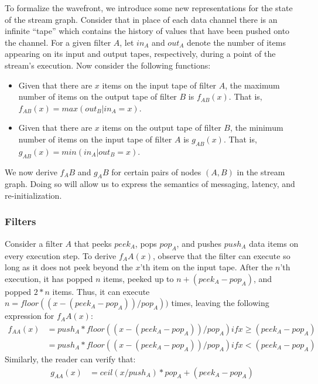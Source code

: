 To formalize the wavefront, we introduce some new representations for
the state of the stream graph.  Consider that in place of each data
channel there is an infinite ``tape'' which contains the history of
values that have been pushed onto the channel.  For a given filter $A$,
let $in_A$ and $out_A$ denote the number of items appearing on its input
and output tapes, respectively, during a point of the stream's
execution.  Now consider the following functions:

\begin{itemize}

\item Given that there are $x$ items on the input tape of filter $A$,
the maximum number of items on the output tape of filter $B$ is
$f_{AB}(x)$.  That is, $f_{AB}(x) = max(out_B | in_A = x)$.

\item Given that there are $x$ items on the output tape of filter $B$,
the minimum number of items on the input tape of filter $A$ is
$g_{AB}(x)$.  That is, $g_{AB}(x) = min(in_A | out_B = x)$.

\end{itemize}

We now derive $f_AB$ and $g_AB$ for certain pairs of nodes $(A, B)$ in
the stream graph.  Doing so will allow us to express the semantics of
messaging, latency, and re-initialization.

\subsubsection{Filters}

Consider a filter $A$ that peeks $peek_A$, pops $pop_A$, and pushes
$push_A$ data items on every execution step.  To derive $f_AA(x)$,
observe that the filter can execute so long as it does not peek beyond
the $x$'th item on the input tape.  After the $n$'th execution, it has
popped $n$ items, peeked up to $n + (peek_A - pop_A)$, and popped $2 *
n$ items.  Thus, it can execute $n = floor((x - (peek_A - pop_A)) /
pop_A))$ times, leaving the following expression for $f_AA(x)$:
\begin{eqnarray*}
f_{AA}(x)&= push_A*floor((x-(peek_A-pop_A))/pop_A) if x \ge (peek_A-pop_A) \\
         &= push_A*floor((x-(peek_A-pop_A))/pop_A) if x <  (peek_A-pop_A)
\end{eqnarray*}
Similarly, the reader can verify that:
\begin{eqnarray*}
g_{AA}(x)&= ceil(x/push_A)*pop_A+(peek_A-pop_A)
\end{eqnarray*}

